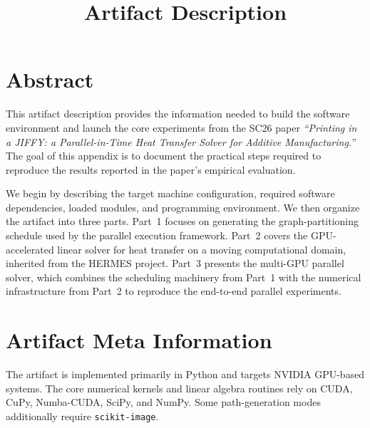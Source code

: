 \documentclass[11pt]{article}
\title{Artifact Description}
\date{}
\begin{document}
\maketitle

\section{Abstract}

This artifact description provides the information needed to build the software
environment and launch the core experiments from the SC26 paper
\emph{``Printing in a JIFFY: a Parallel-in-Time Heat Transfer Solver for
Additive Manufacturing.''} The goal of this appendix is to document the
practical steps required to reproduce the results reported in the paper's
empirical evaluation.

We begin by describing the target machine configuration, required software
dependencies, loaded modules, and programming environment. We then organize the
artifact into three parts. Part~1 focuses on generating the graph-partitioning
schedule used by the parallel execution framework. Part~2 covers the
GPU-accelerated linear solver for heat transfer on a moving computational
domain, inherited from the HERMES project. Part~3 presents the multi-GPU
parallel solver, which combines the scheduling machinery from Part~1 with the
numerical infrastructure from Part~2 to reproduce the end-to-end parallel
experiments.

\section{Artifact Meta Information}

The artifact is implemented primarily in Python and targets NVIDIA GPU-based
systems. The core numerical kernels and linear algebra routines rely on CUDA,
CuPy, Numba-CUDA, SciPy, and NumPy. Some path-generation modes additionally
require \texttt{scikit-image}.
\end{document}
